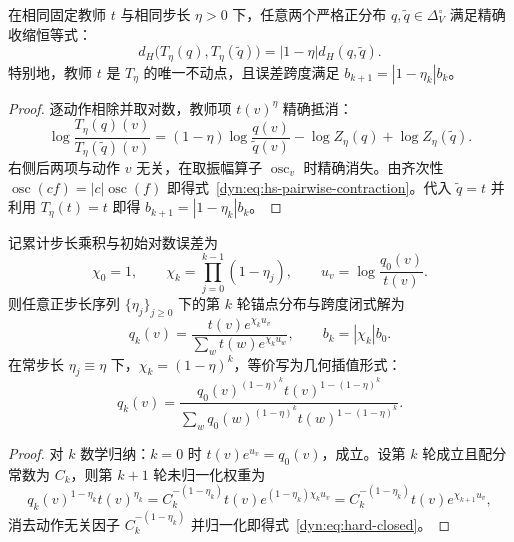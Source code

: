 \documentclass[lang=cn,scheme=chinese,openany]{elegantbook}
\begin{document}
\begin{theorem}[两条精确硬同步轨迹的成对收缩]
\label{dyn:thm:hs-pairwise-contraction}
在相同固定教师 $t$ 与相同步长 $\eta>0$ 下，任意两个严格正分布 $q,\widetilde q\in\Delta_V^\circ$ 满足精确收缩恒等式：
\begin{equation}\label{dyn:eq:hs-pairwise-contraction}
 d_H\bigl(T_\eta(q),T_\eta(\widetilde q)\bigr)
 =|1-\eta|d_H(q,\widetilde q).
\end{equation}
特别地，教师 $t$ 是 $T_\eta$ 的唯一不动点，且误差跨度满足 $b_{k+1}=|1-\eta_k|b_k$。
\end{theorem}
\begin{proof}
逐动作相除并取对数，教师项 $t(v)^\eta$ 精确抵消：
\begin{equation*}
 \log\frac{T_\eta(q)(v)}{T_\eta(\widetilde q)(v)}
 =(1-\eta)\log\frac{q(v)}{\widetilde q(v)}
 -\log Z_\eta(q)+\log Z_\eta(\widetilde q).
\end{equation*}
右侧后两项与动作 $v$ 无关，在取振幅算子 $\operatorname{osc}_v$ 时精确消失。由齐次性 $\operatorname{osc}(cf)=|c|\operatorname{osc}(f)$ 即得式~\eqref{dyn:eq:hs-pairwise-contraction}。代入 $\widetilde q=t$ 并利用 $T_\eta(t)=t$ 即得 $b_{k+1}=|1-\eta_k|b_k$。
\end{proof}

\begin{theorem}[常步长与变步长精确硬同步的闭式解]
\label{dyn:thm:hard-sync}
记累计步长乘积与初始对数误差为
\begin{equation*}
 \chi_0=1,\qquad \chi_k=\prod_{j=0}^{k-1}(1-\eta_j),
 \qquad u_v=\log\frac{q_0(v)}{t(v)}.
\end{equation*}
则任意正步长序列 $\{\eta_j\}_{j\ge 0}$ 下的第 $k$ 轮锚点分布与跨度闭式解为
\begin{equation}\label{dyn:eq:hard-closed}
 q_k(v)=\frac{t(v)e^{\chi_k u_v}}
 {\sum_w t(w)e^{\chi_k u_w}},
 \qquad b_k=|\chi_k|b_0.
\end{equation}
在常步长 $\eta_j\equiv\eta$ 下，$\chi_k=(1-\eta)^k$，等价写为几何插值形式：
\begin{equation*}
 q_k(v)=\frac{q_0(v)^{(1-\eta)^k}
 t(v)^{1-(1-\eta)^k}}
 {\sum_w q_0(w)^{(1-\eta)^k}
 t(w)^{1-(1-\eta)^k}}.
\end{equation*}
\end{theorem}
\begin{proof}
对 $k$ 数学归纳：$k=0$ 时 $t(v)e^{u_v}=q_0(v)$，成立。设第 $k$ 轮成立且配分常数为 $C_k$，则第 $k+1$ 轮未归一化权重为
\begin{equation*}
 q_k(v)^{1-\eta_k}t(v)^{\eta_k}
 =C_k^{-(1-\eta_k)}t(v)e^{(1-\eta_k)\chi_k u_v}
 =C_k^{-(1-\eta_k)}t(v)e^{\chi_{k+1}u_v},
\end{equation*}
消去动作无关因子 $C_k^{-(1-\eta_k)}$ 并归一化即得式~\eqref{dyn:eq:hard-closed}。
\end{proof}
\end{document}
